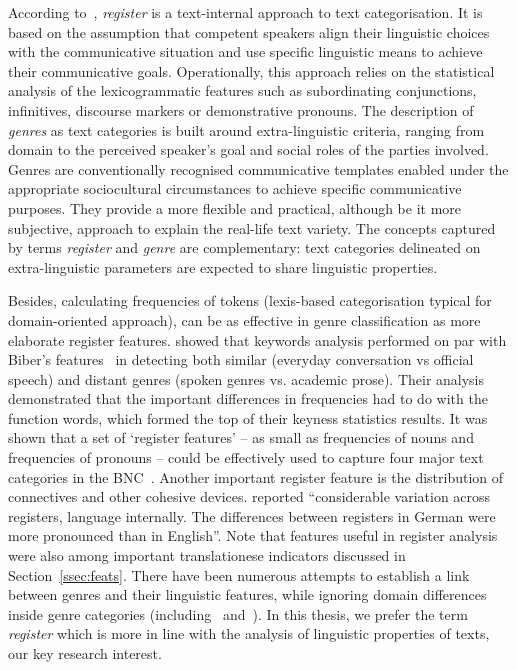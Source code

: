 According to~\citet{Lee01}, \textit{register} is a text-internal approach to text categorisation. It is based on the assumption that competent speakers align their linguistic choices with the communicative situation and use specific linguistic means to achieve their communicative goals. Operationally, this approach relies on the statistical analysis of the lexicogrammatic features such as subordinating conjunctions, infinitives, discourse markers or demonstrative pronouns. %
The description of \textit{genres} as text categories is built around extra-linguistic criteria, ranging from domain to the perceived speaker's goal and social roles of the parties involved. Genres are conventionally recognised communicative templates enabled under the appropriate sociocultural circumstances to achieve specific communicative purposes. They provide a more flexible and practical, although be it more subjective, approach to explain the real-life text variety. 
The concepts captured by terms \textit{register} and \textit{genre} are complementary: text categories delineated on extra-linguistic parameters are expected to share linguistic properties. 

Besides, calculating frequencies of tokens (lexis-based categorisation typical for domain-oriented approach), can be as effective in genre classification as more elaborate register features. \citet{Xiao2005} showed that keywords analysis performed on par with Biber's features~\cite{Biber1988} in detecting both similar (everyday conversation vs official speech) and distant genres (spoken genres vs. academic prose). Their analysis demonstrated that the important differences in frequencies had to do with the function words, which formed the top of their keyness statistics results. It was shown that a set of `register features' -- as small as frequencies of nouns and frequencies of pronouns -- could be effectively used to capture four major text categories in the BNC~\cite{Lijffijt2017}. Another important register feature is the distribution of connectives and other cohesive devices. \citet[p.286]{Kunz2017} reported ``considerable variation across registers, language internally. The differences between registers in German were more pronounced than in English''. Note that features useful in register analysis were also among important translationese indicators discussed in Section~\ref{ssec:feats}. 
There have been numerous attempts to establish a link between genres and their linguistic features, while ignoring domain differences inside genre categories (including~\citet{Lee01} and~\citet{Braslavski2010}). 
In this thesis, we prefer the term \textit{register} which is more in line with the analysis of linguistic properties of texts, our key research interest.

